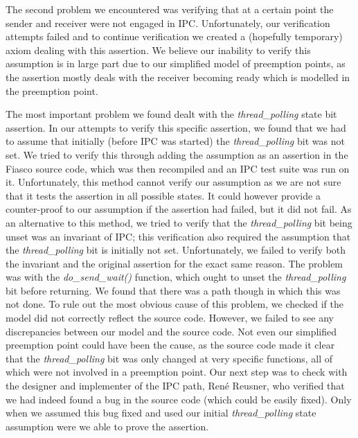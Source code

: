 The second problem we encountered was verifying that at a certain point the sender and receiver were not engaged in IPC. Unfortunately, our verification attempts failed and to continue verification we created a (hopefully temporary) axiom dealing with this assertion. We believe our inability to verify this assumption is in large part due to our simplified model of preemption points, as the assertion mostly deals with the receiver becoming ready which is modelled in the preemption point.\emptyline

The most important problem we found dealt with the \emph{thread\_polling} state bit assertion. In our attempts to verify this specific assertion, we found that we had to assume that initially (before IPC was started) the \emph{thread\_polling} bit was not set. We tried to verify this through adding the assumption as an assertion in the Fiasco source code, which was then recompiled and an IPC test suite was run on it. Unfortunately, this method cannot verify our assumption as we are not sure that it tests the assertion in all possible states. It could however provide a counter-proof to our assumption if the assertion had failed, but it did not fail. As an alternative to this method, we tried to verify that the \emph{thread\_polling} bit being unset was an invariant of IPC; this verification also required the assumption that the \emph{thread\_polling} bit is initially not set. Unfortunately, we failed to verify both the invariant and the original assertion for the exact same reason. The problem was with the \emph{do\_send\_wait()} function, which ought to unset the \emph{thread\_polling} bit before returning. We found that there was a path though in which this was not done. To rule out the most obvious cause of this problem, we checked if the model did not correctly reflect the source code. However, we failed to see any discrepancies between our model and the source code. Not even our simplified preemption point could have been the cause, as the source code made it clear that the \emph{thread\_polling} bit was only changed at very specific functions, all of which were not involved in a preemption point. Our next step was to check with the designer and implementer of the IPC path, Ren{\'e} Reusner, who verified that we had indeed found a bug in the source code (which could be easily fixed). Only when we assumed this bug fixed and used our initial \emph{thread\_polling} state assumption were we able to prove the assertion.\emptyline

